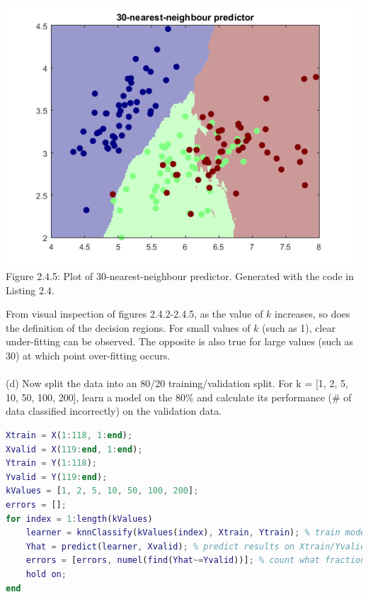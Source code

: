 \documentclass[]{report}   %
\begin{document}
\begin{center}
	\includegraphics[width=35em]{2_4_Figure_5.png}
	{Figure 2.4.5: Plot of 30-nearest-neighbour predictor. Generated with the code in Listing 2.4.}
\end{center} 
{From visual inspection of figures 2.4.2-2.4.5, as the value of $k$ increases, so does the definition of the decision regions. For small values of $k$ (such as 1), clear under-fitting can be observed. The opposite is also true for large values (such as 30) at which point over-fitting occurs.}
\\~\\
{(d) Now split the data into an 80/20 training/validation split. For k = [1, 2, 5, 10, 50, 100, 200], learn a model on the 80$\%$ and calculate its performance ($\#$ of data classified incorrectly) on the validation data.}
\begin{lstlisting}[language=Matlab, caption=Training models on 80\% training data and calculating its performance on 20\% validation data.]
Xtrain = X(1:118, 1:end);
Xvalid = X(119:end, 1:end);
Ytrain = Y(1:118);
Yvalid = Y(119:end);
kValues = [1, 2, 5, 10, 50, 100, 200];
errors = [];
for index = 1:length(kValues)
    learner = knnClassify(kValues(index), Xtrain, Ytrain); % train model on X/Ytrain
    Yhat = predict(learner, Xvalid); % predict results on Xtrain/Yvalid
    errors = [errors, numel(find(Yhat~=Yvalid))]; % count what fraction of predictions are wrong   
    hold on;
end
\end{lstlisting}
\end{document}
